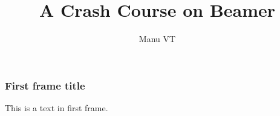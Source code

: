 \documentclass{beamer}
\title{A Crash Course on Beamer}
\author{Manu VT}
\institute{SCIS@UoH}
\date{}
\begin{document}
	\frame{\titlepage}
	\begin{frame}
	\frametitle{First frame title}
	This is a text in first frame. 
	\end{frame}
	
\end{document}
